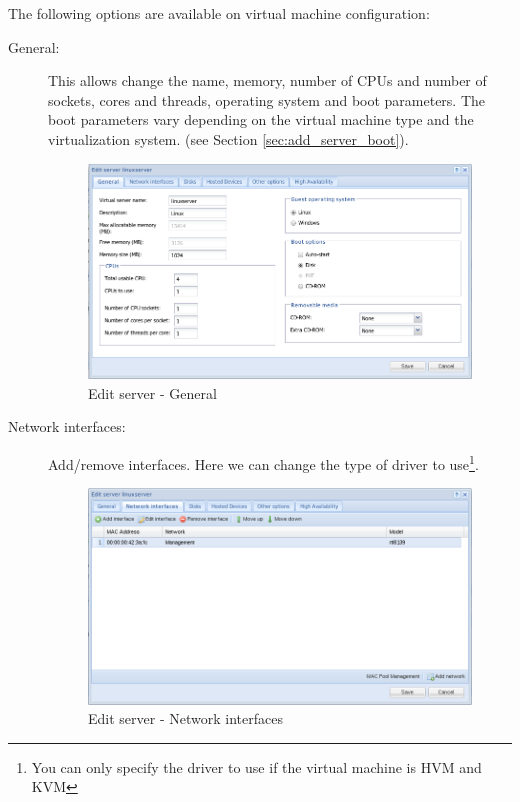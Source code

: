 The following options are available on virtual machine configuration:
\begin{description}
	\item[General:] This allows change the name, memory, number of CPUs and number of sockets, cores and threads, operating system and boot parameters.
            The boot parameters vary depending on the virtual machine type and the virtualization system. (see Section \ref{sec:add_server_boot}).

		\begin{figure}[H]
        		\begin{center}
		        \includegraphics[scale=0.5]{screenshots/server_edit_general.png}
        		\caption{Edit server - General}
	        	\label{fig:server_edit_general}
	        	\end{center}
		\end{figure}

	\item[Network interfaces:] Add/remove interfaces. Here we can change the type of driver to use\footnote{You can only specify the driver to use if the virtual machine is HVM and KVM}.
		\begin{figure}[H]
        		\begin{center}
		        \includegraphics[scale=0.5]{screenshots/server_edit_interfaces.png}
        		\caption{Edit server - Network interfaces}
	        	\label{fig:server_edit_interfaces}
	        	\end{center}
		\end{figure}


\end{description}
